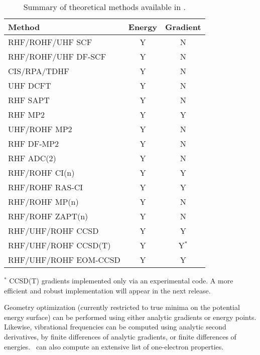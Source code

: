 \begin{table}
\caption{Summary of theoretical methods available in \PSIfour.} \label{table:methods}
\parsep 10pt
\begin{center}
\begin{tabular}{lcc} \hline\hline
Method                & Energy & Gradient \\ \hline
RHF/ROHF/UHF SCF     & Y & N \\
RHF/ROHF/UHF DF-SCF   & Y & N \\
CIS/RPA/TDHF          & Y & N \\
UHF DCFT              & Y & N \\
RHF SAPT              & Y & N \\
RHF MP2               & Y & Y \\
UHF/ROHF MP2          & Y & N \\
RHF DF-MP2            & Y & N \\
RHF ADC(2)            & Y & N \\
RHF/ROHF CI(n)        & Y & Y \\
RHF/ROHF RAS-CI       & Y & Y \\
RHF/ROHF MP(n)        & Y & N \\
RHF/ROHF ZAPT(n)      & Y & N \\
RHF/UHF/ROHF CCSD     & Y & Y \\
RHF/UHF/ROHF CCSD(T)  & Y & Y$^*$ \\
RHF/UHF/ROHF EOM-CCSD & Y & Y \\
\hline\hline
\end{tabular}
\end{center}
\footnotesize{$^*$ CCSD(T) gradients implemented only via an experimental
code.  A more efficient and robust implementation will appear in the next
release.}
\end{table}
Geometry optimization (currently restricted to true minima on the potential
energy surface) can be performed using either analytic gradients
or energy points.  Likewise, vibrational frequencies can be 
computed using analytic second derivatives, by finite
differences of analytic gradients, or finite differences of energies.
\PSIfour\ can also compute an extensive list of one-electron properties.

